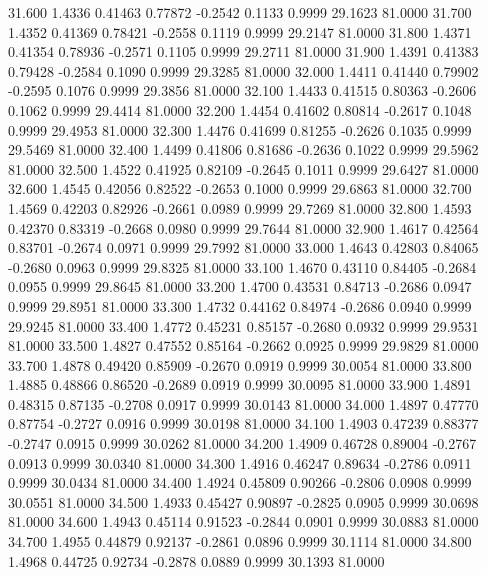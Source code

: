   31.600   1.4336   0.41463   0.77872  -0.2542   0.1133   0.9999  29.1623  81.0000
  31.700   1.4352   0.41369   0.78421  -0.2558   0.1119   0.9999  29.2147  81.0000
  31.800   1.4371   0.41354   0.78936  -0.2571   0.1105   0.9999  29.2711  81.0000
  31.900   1.4391   0.41383   0.79428  -0.2584   0.1090   0.9999  29.3285  81.0000
  32.000   1.4411   0.41440   0.79902  -0.2595   0.1076   0.9999  29.3856  81.0000
  32.100   1.4433   0.41515   0.80363  -0.2606   0.1062   0.9999  29.4414  81.0000
  32.200   1.4454   0.41602   0.80814  -0.2617   0.1048   0.9999  29.4953  81.0000
  32.300   1.4476   0.41699   0.81255  -0.2626   0.1035   0.9999  29.5469  81.0000
  32.400   1.4499   0.41806   0.81686  -0.2636   0.1022   0.9999  29.5962  81.0000
  32.500   1.4522   0.41925   0.82109  -0.2645   0.1011   0.9999  29.6427  81.0000
  32.600   1.4545   0.42056   0.82522  -0.2653   0.1000   0.9999  29.6863  81.0000
  32.700   1.4569   0.42203   0.82926  -0.2661   0.0989   0.9999  29.7269  81.0000
  32.800   1.4593   0.42370   0.83319  -0.2668   0.0980   0.9999  29.7644  81.0000
  32.900   1.4617   0.42564   0.83701  -0.2674   0.0971   0.9999  29.7992  81.0000
  33.000   1.4643   0.42803   0.84065  -0.2680   0.0963   0.9999  29.8325  81.0000
  33.100   1.4670   0.43110   0.84405  -0.2684   0.0955   0.9999  29.8645  81.0000
  33.200   1.4700   0.43531   0.84713  -0.2686   0.0947   0.9999  29.8951  81.0000
  33.300   1.4732   0.44162   0.84974  -0.2686   0.0940   0.9999  29.9245  81.0000
  33.400   1.4772   0.45231   0.85157  -0.2680   0.0932   0.9999  29.9531  81.0000
  33.500   1.4827   0.47552   0.85164  -0.2662   0.0925   0.9999  29.9829  81.0000
  33.700   1.4878   0.49420   0.85909  -0.2670   0.0919   0.9999  30.0054  81.0000
  33.800   1.4885   0.48866   0.86520  -0.2689   0.0919   0.9999  30.0095  81.0000
  33.900   1.4891   0.48315   0.87135  -0.2708   0.0917   0.9999  30.0143  81.0000
  34.000   1.4897   0.47770   0.87754  -0.2727   0.0916   0.9999  30.0198  81.0000
  34.100   1.4903   0.47239   0.88377  -0.2747   0.0915   0.9999  30.0262  81.0000
  34.200   1.4909   0.46728   0.89004  -0.2767   0.0913   0.9999  30.0340  81.0000
  34.300   1.4916   0.46247   0.89634  -0.2786   0.0911   0.9999  30.0434  81.0000
  34.400   1.4924   0.45809   0.90266  -0.2806   0.0908   0.9999  30.0551  81.0000
  34.500   1.4933   0.45427   0.90897  -0.2825   0.0905   0.9999  30.0698  81.0000
  34.600   1.4943   0.45114   0.91523  -0.2844   0.0901   0.9999  30.0883  81.0000
  34.700   1.4955   0.44879   0.92137  -0.2861   0.0896   0.9999  30.1114  81.0000
  34.800   1.4968   0.44725   0.92734  -0.2878   0.0889   0.9999  30.1393  81.0000
